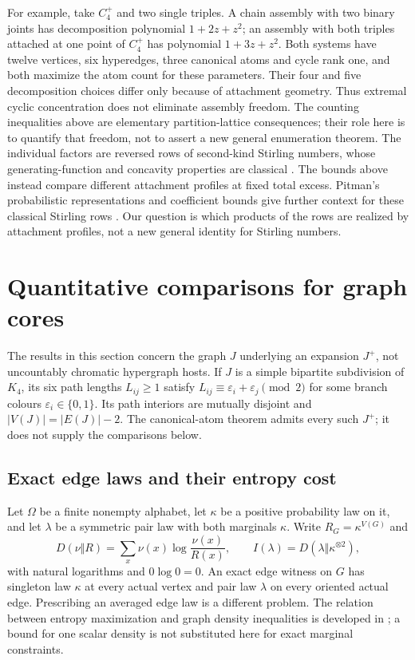 \documentclass[a4paper,11pt,reqno]{amsart}
\theoremstyle{plain}
\theoremstyle{definition}
\theoremstyle{remark}
\begin{document}
For example, take $C_4^+$ and two single triples.  A chain assembly with two
binary joints has decomposition polynomial $1+2z+z^2$; an assembly with both
triples attached at one point of $C_4^+$ has polynomial $1+3z+z^2$.
Both systems have twelve vertices, six hyperedges, three canonical atoms
and cycle rank one, and both maximize the atom count for these parameters.
Their four and five decomposition choices differ only because of attachment
geometry.  Thus extremal cyclic concentration does not eliminate assembly
freedom.  The counting inequalities above are elementary partition-lattice
consequences; their role here is to quantify that freedom, not to assert a
new general enumeration theorem.
The individual factors are reversed rows of second-kind Stirling numbers,
whose generating-function and concavity properties are classical
\citep{lieb1968}.  The bounds above instead compare different attachment
profiles at fixed total excess.
Pitman's probabilistic representations and coefficient bounds give further
context for these classical Stirling rows \citep{pitman1997}.  Our question
is which products of the rows are realized by attachment profiles, not a
new general identity for Stirling numbers.

\section{Quantitative comparisons for graph cores}
\label{sec:quantitative-cores}

The results in this section concern the graph $J$ underlying an expansion
$J^+$, not uncountably chromatic hypergraph hosts.  If $J$ is a simple
bipartite subdivision of $K_4$, its six path lengths $L_{ij}\ge1$ satisfy
$L_{ij}\equiv\varepsilon_i+\varepsilon_j\pmod2$ for some branch colours
$\varepsilon_i\in\{0,1\}$.  Its path interiors are mutually disjoint and
$|V(J)|=|E(J)|-2$.  The canonical-atom theorem admits every such $J^+$;
it does not supply the comparisons below.

\subsection{Exact edge laws and their entropy cost}
Let $\Omega$ be a finite nonempty alphabet, let $\kappa$ be a positive
probability law on it, and let $\lambda$ be a symmetric pair law with both
marginals $\kappa$.  Write $R_G=\kappa^{V(G)}$ and
\[
 D(\nu\Vert R)=\sum_x\nu(x)\log\frac{\nu(x)}{R(x)},
 \qquad I(\lambda)=D(\lambda\Vert\kappa^{\otimes2}),
\]
with natural logarithms and $0\log0=0$.  An exact edge witness on $G$
has singleton law $\kappa$ at every actual vertex and pair law $\lambda$
on every oriented actual edge.  Prescribing an averaged edge law is a
different problem.  The relation between entropy maximization and graph
density inequalities is developed in \citet{szegedy2015}; a bound for one
scalar density is not substituted here for exact marginal constraints.
\end{document}
